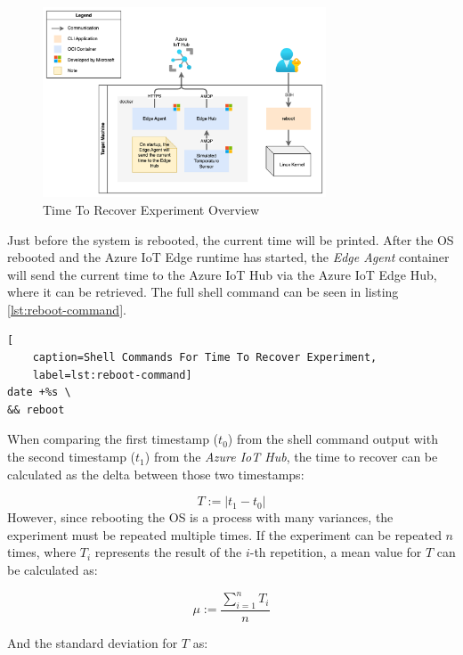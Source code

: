 \begin{figure}[H]
    \centering
    \includegraphics[width=0.75\textwidth]{fig/reboot-setup.drawio.png}
    \caption{Time To Recover Experiment Overview}
\end{figure}

\noindent
Just before the system is rebooted, the current time will be printed.
After the \ac{OS} rebooted and the Azure IoT Edge runtime has started, the
\textit{Edge Agent} container will send the current time to the Azure IoT Hub via
the Azure IoT Edge Hub, where it can be retrieved. The full shell command can
be seen in listing \ref{lst:reboot-command}.
\\

\begin{lstlisting}[
    caption=Shell Commands For Time To Recover Experiment,
    label=lst:reboot-command]
date +%s \
&& reboot
\end{lstlisting}

\noindent
When comparing the first timestamp ($t_0$) from the shell command output with the second
timestamp ($t_1$) from the \textit{Azure IoT Hub}, the time to recover can be calculated
as the delta between those two timestamps:

\begin{equation}
    T := |t_1 - t_0|
\end{equation}
However, since rebooting the \ac{OS} is a process with many variances, the experiment
must be repeated multiple times. If the experiment can be repeated $n$ times, where
$T_i$ represents the result of the $i$-th repetition, a mean value for $T$ can be 
calculated as:

\begin{equation}
    \mu := \frac{\sum_{i=1}^{n}T_i}{n}
\end{equation}

\noindent
And the standard deviation for $T$ as:

